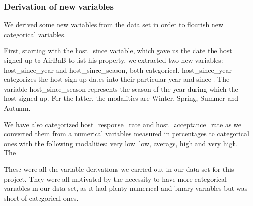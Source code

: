 \subsubsection{Derivation of new variables}
We derived some new variables from the data set in order to flourish new categorical variables.

First, starting with the host\_since variable, which gave us the date the host signed up to AirBnB
to list his property, we extracted two new variables: host\_since\_year and host\_since\_season,
both categorical. host\_since\_year categorizes the host sign up dates into their particular year and since . 
The variable host\_since\_season represents the season of the year during which
the host signed up. For the latter, the modalities are Winter, Spring, Summer and Autumn.

We have also categorized host\_response\_rate and host\_acceptance\_rate
as we converted them from a numerical variables measured in percentages to 
categorical ones with the following modalities: very low, low, average, 
high and very high. The 

These were all the variable derivations we carried out in our data set for this 
project. They were all motivated by the necessity to have more categorical
variables in our data set, as it had plenty numerical and binary variables
but was short of categorical ones.



